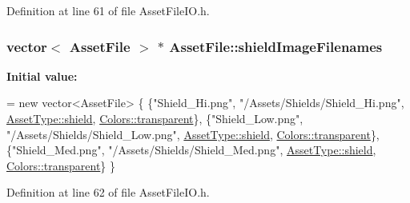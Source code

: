 Definition at line 61 of file Asset\-File\-I\-O.\-h.

\hypertarget{struct_asset_file_a190e00509710ab08fa4effe17ef443f0}{
\subsubsection[{shield\-Image\-Filenames}]{\setlength{\rightskip}{0pt plus 5cm}vector$<$ {\bf Asset\-File} $>$ $\ast$ Asset\-File\-::shield\-Image\-Filenames\hspace{0.3cm}{\ttfamily [static]}}}\label{struct_asset_file_a190e00509710ab08fa4effe17ef443f0}
{\bfseries Initial value\-:}
\begin{DoxyCode}
= \textcolor{keyword}{new} vector<AssetFile> \{
    \{\textcolor{stringliteral}{"Shield\_Hi.png"},           \textcolor{stringliteral}{"/Assets/Shields/Shield\_Hi.png"},            
      \hyperlink{_asset_file_i_o_8h_a72d924d1cb8e1544b6d5198e98d52ca9a28c69b4cba5681d565d3bd901684dd77}{AssetType::shield}, \hyperlink{_character_data_8h_a55ecd4f2ec2ebfe8d5b0163e4ac2a967a5e96bf62b9b2c18fdb65564b4a18fd1f}{Colors::transparent}\},
    \{\textcolor{stringliteral}{"Shield\_Low.png"},          \textcolor{stringliteral}{"/Assets/Shields/Shield\_Low.png"},           
      \hyperlink{_asset_file_i_o_8h_a72d924d1cb8e1544b6d5198e98d52ca9a28c69b4cba5681d565d3bd901684dd77}{AssetType::shield}, \hyperlink{_character_data_8h_a55ecd4f2ec2ebfe8d5b0163e4ac2a967a5e96bf62b9b2c18fdb65564b4a18fd1f}{Colors::transparent}\},
    \{\textcolor{stringliteral}{"Shield\_Med.png"},          \textcolor{stringliteral}{"/Assets/Shields/Shield\_Med.png"},           
      \hyperlink{_asset_file_i_o_8h_a72d924d1cb8e1544b6d5198e98d52ca9a28c69b4cba5681d565d3bd901684dd77}{AssetType::shield}, \hyperlink{_character_data_8h_a55ecd4f2ec2ebfe8d5b0163e4ac2a967a5e96bf62b9b2c18fdb65564b4a18fd1f}{Colors::transparent}\}
\}
\end{DoxyCode}


Definition at line 62 of file Asset\-File\-I\-O.\-h.

